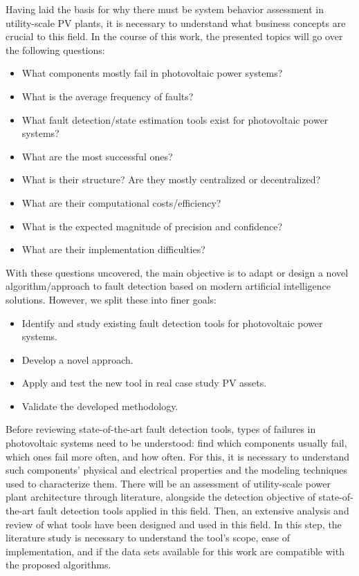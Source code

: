 Having laid the basis for why there must be system behavior assessment in utility-scale PV plants, it is necessary to understand what business concepts are crucial to this field. In the course of this work, the presented topics will go over the following questions:

\begin{itemize}
    \item What components mostly fail in photovoltaic power systems?
    \item What is the average frequency of faults?
    \item What fault detection/state estimation tools exist for photovoltaic
    power systems?
    \item What are the most successful ones?
    \item What is their structure? Are they mostly centralized or decentralized?
    \item What are their computational costs/efficiency?
    \item What is the expected magnitude of precision and confidence?
    \item What are their implementation difficulties?
\end{itemize}

With these questions uncovered, the main objective is to adapt or design a novel algorithm/approach to fault detection based on modern artificial intelligence solutions. However, we split these into finer goals:

\begin{itemize}
    \item  Identify and study existing fault detection tools for photovoltaic
    power systems.
    \item  Develop a novel approach.
    \item Apply and test the new tool in real case study PV assets.
    \item Validate the developed methodology.
\end{itemize}

Before reviewing state-of-the-art fault detection tools, types of failures in photovoltaic systems need to be understood: find which components usually fail, which ones fail more often, and how often. For this, it is necessary to understand such components' physical and electrical properties and the modeling techniques used to characterize them. There will be an assessment of utility-scale power plant architecture through literature, alongside the detection objective of state-of-the-art fault detection tools applied in this field. Then, an extensive analysis and review of what tools have been designed and used in this field. In this step, the literature study is necessary to understand the tool's scope, ease of implementation, and if the data sets available for this work are compatible with the proposed algorithms.

